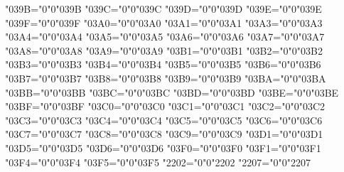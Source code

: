 {    \Umathcode"039B="0"0"039B%
    \Umathcode"039C="0"0"039C%
    \Umathcode"039D="0"0"039D%
    \Umathcode"039E="0"0"039E%
    \Umathcode"039F="0"0"039F%
    \Umathcode"03A0="0"0"03A0%
    \Umathcode"03A1="0"0"03A1%
    \Umathcode"03A3="0"0"03A3%
    \Umathcode"03A4="0"0"03A4%
    \Umathcode"03A5="0"0"03A5%
    \Umathcode"03A6="0"0"03A6%
    \Umathcode"03A7="0"0"03A7%
    \Umathcode"03A8="0"0"03A8%
    \Umathcode"03A9="0"0"03A9%
    \Umathcode"03B1="0"0"03B1%
    \Umathcode"03B2="0"0"03B2%
    \Umathcode"03B3="0"0"03B3%
    \Umathcode"03B4="0"0"03B4%
    \Umathcode"03B5="0"0"03B5%
    \Umathcode"03B6="0"0"03B6%
    \Umathcode"03B7="0"0"03B7%
    \Umathcode"03B8="0"0"03B8%
    \Umathcode"03B9="0"0"03B9%
    \Umathcode"03BA="0"0"03BA%
    \Umathcode"03BB="0"0"03BB%
    \Umathcode"03BC="0"0"03BC%
    \Umathcode"03BD="0"0"03BD%
    \Umathcode"03BE="0"0"03BE%
    \Umathcode"03BF="0"0"03BF%
    \Umathcode"03C0="0"0"03C0%
    \Umathcode"03C1="0"0"03C1%
    \Umathcode"03C2="0"0"03C2%
    \Umathcode"03C3="0"0"03C3%
    \Umathcode"03C4="0"0"03C4%
    \Umathcode"03C5="0"0"03C5%
    \Umathcode"03C6="0"0"03C6%
    \Umathcode"03C7="0"0"03C7%
    \Umathcode"03C8="0"0"03C8%
    \Umathcode"03C9="0"0"03C9%
    \Umathcode"03D1="0"0"03D1%
    \Umathcode"03D5="0"0"03D5%
    \Umathcode"03D6="0"0"03D6%
    \Umathcode"03F0="0"0"03F0%
    \Umathcode"03F1="0"0"03F1%
    \Umathcode"03F4="0"0"03F4%
    \Umathcode"03F5="0"0"03F5%
    \Umathcode"2202="0"0"2202%
    \Umathcode"2207="0"0"2207%
    \relax
}

\everymathmit {%
}

\everymathcal {%
}


